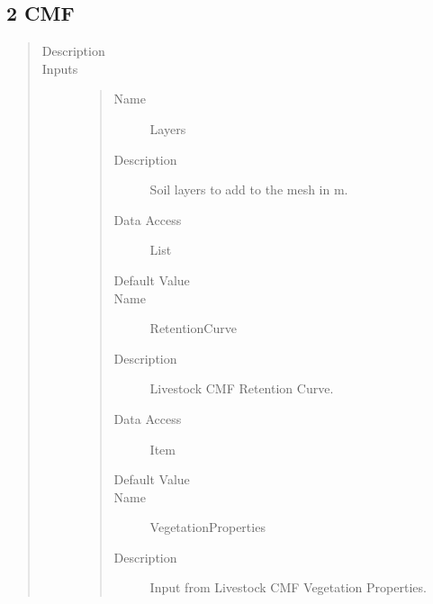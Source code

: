 \documentclass[letterpaper,10pt,english]{sphinxmanual}
\begin{document}
\subsection{2 \textbar{} CMF}
\label{\detokenize{components:cmf}}
\begin{quote}\begin{description}
\item[{Description}] \leavevmode
{}

\item[{Inputs}] \leavevmode\begin{quote}\begin{description}
\item[{Name}] \leavevmode
Layers

\item[{Description}] \leavevmode
Soil layers to add to the mesh in m.

\item[{Data Access}] \leavevmode
List

\item[{Default Value}] \leavevmode
{}

\item[{Name}] \leavevmode
RetentionCurve

\item[{Description}] \leavevmode
Livestock CMF Retention Curve.

\item[{Data Access}] \leavevmode
Item

\item[{Default Value}] \leavevmode
{}

\item[{Name}] \leavevmode
VegetationProperties

\item[{Description}] \leavevmode
Input from Livestock CMF Vegetation Properties.


\end{description}
\end{quote}
\end{description}
\end{quote}
\end{document}
